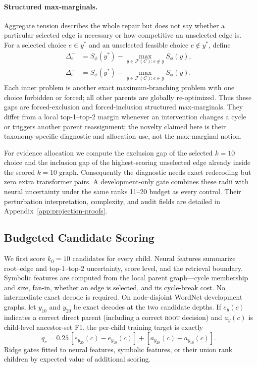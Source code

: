 \documentclass[11pt]{article}
\newcommand{\rootnode}{\textsc{root}}
\begin{document}
\paragraph{Structured max-marginals.}
Aggregate tension describes the whole repair but does not say whether a
particular selected edge is necessary or how competitive an unselected edge is.
For a selected choice $e\in y^*$ and an unselected feasible choice
$e\notin y^*$, define
\begin{align}
\Delta_e^- &= S_\phi(y^*)-\max_{y\in\mathcal F(C):e\notin y}S_\phi(y),\\
\Delta_e^+ &= S_\phi(y^*)-\max_{y\in\mathcal F(C):e\in y}S_\phi(y).
\label{eq:counterfactual-gaps}
\end{align}
Each inner problem is another exact maximum-branching problem with one choice
forbidden or forced; all other parents are globally re-optimized. Thus these
gaps are forced-exclusion and forced-inclusion structured max-marginals. They
differ from a local top-1--top-2 margin whenever an intervention changes a
cycle or triggers another parent reassignment; the novelty claimed here is
their taxonomy-specific diagnostic and allocation use, not the max-marginal notion.

For evidence allocation we compute the exclusion gap of the selected $k=10$
choice and the inclusion gap of the highest-scoring unselected edge already
inside the scored $k=10$ graph. Consequently the diagnostic needs exact
redecoding but zero extra transformer pairs. A development-only gate combines
these radii with neural uncertainty under the same ranks 11--20 budget as every
control. Their perturbation interpretation, complexity, and audit fields are
detailed in Appendix~\ref{app:projection-proofs}.

\subsection{Budgeted Candidate Scoring}

We first score $k_0=10$ candidates for every child. Neural features summarize
root--edge and top-1--top-2 uncertainty, score level, and the retrieval
boundary. Symbolic features are computed from the local parent graph---cycle
membership and size, fan-in, whether an edge is selected, and its cycle-break
cost. No intermediate exact decode is required. On node-disjoint WordNet
development graphs, let $y_{10}$ and $y_{20}$ be exact decodes at the two
candidate depths. If $e_y(c)$ indicates a correct direct parent (including a
correct \rootnode{} decision) and $a_y(c)$ is child-level ancestor-set F1, the
per-child training target is exactly
\begin{equation}
 q_c=0.25\,[e_{y_{20}}(c)-e_{y_{10}}(c)]
     +[a_{y_{20}}(c)-a_{y_{10}}(c)].
 \label{eq:allocation-target}
\end{equation}
Ridge gates fitted to neural features, symbolic features, or their union rank
children by expected value of additional scoring.
\end{document}
